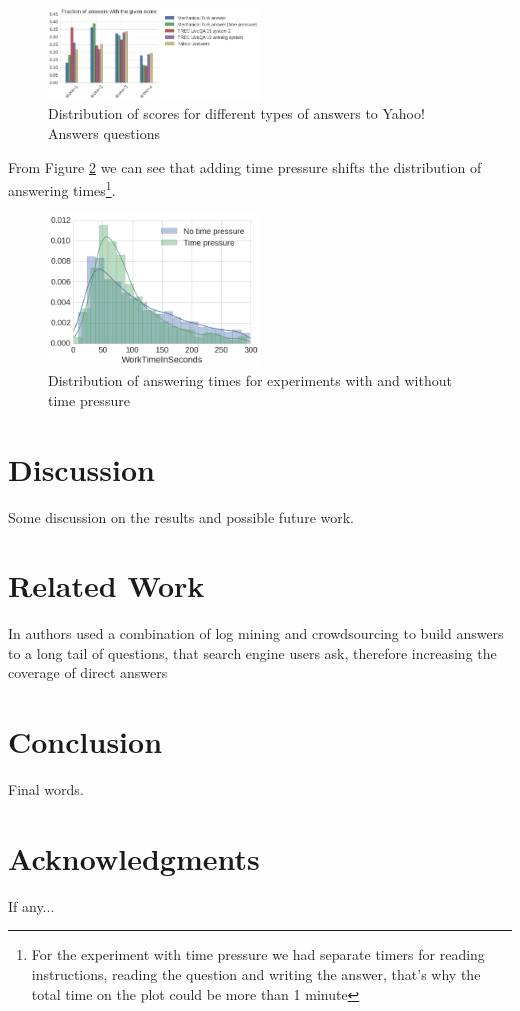 \documentclass[11pt,letterpaper]{article}
\begin{document}
\begin{figure}[h]
\centering
\includegraphics[width=0.5\textwidth]{img/scores_distribution}
\caption{Distribution of scores for different types of answers to Yahoo! Answers questions}
\label{fig:scores_distribution}
\end{figure}

From Figure \ref{fig:answering_time_distribution} we can see that adding time pressure shifts the distribution of answering times\footnote{For the experiment with time pressure we had separate timers for reading instructions, reading the question and writing the answer, that's why the total time on the plot could be more than 1 minute}.

\begin{figure}[h]
	\centering
	\includegraphics[width=0.5\textwidth]{img/answering_time_distribution}
	\caption{Distribution of answering times for experiments with and without time pressure}
	\label{fig:answering_time_distribution}
\end{figure}


\section{Discussion}
\label{sec:discussion}

Some discussion on the results and possible future work.

\section{Related Work}
\label{sec:related_work}

In \cite{bernstein2012direct} authors used a combination of log mining and crowdsourcing to build answers to a long tail of questions, that search engine users ask, therefore increasing the coverage of direct answers

\section{Conclusion}
\label{sec:conclusion}

Final words.

\section*{Acknowledgments}

If any...



\end{document}
